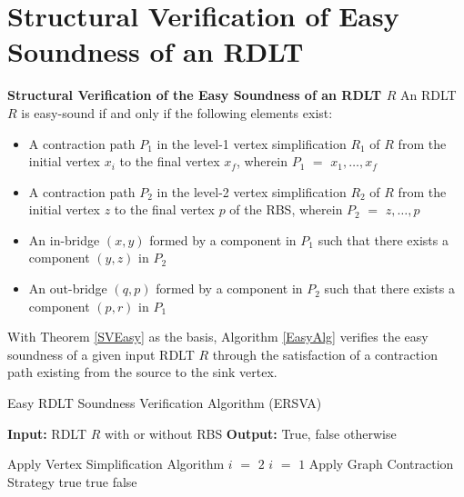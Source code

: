 \section*{Structural Verification of Easy Soundness of an RDLT}

\begin{thm}\textbf{Structural Verification of the Easy Soundness of an RDLT $ R $}
    \label{SVEasy}
    An RDLT $ R $ is easy-sound if and only if the following elements exist: 
    \begin{itemize}
        \item A contraction path $ P_1 $ in the level-1 vertex simplification $ R_1 $ of $ R $ from the initial vertex $ x_i $ to the final vertex $ x_f $, wherein $ P_1 $ $ = $ $ x_1, \ldots, x_f $
        \item A contraction path $ P_2 $ in the level-2 vertex simplification $ R_2 $ of $ R $ from the initial vertex $ z $ to the final vertex $ p $ of the RBS, wherein $ P_2 $ $ = $ $ z, \ldots, p $
        \item An in-bridge $ (x,y) $ formed by a component in $ P_1 $ such that there exists a component $ (y,z) $ in $ P_2 $
        \item An out-bridge $ (q,p) $ formed by a component in $ P_2 $ such that there exists a component $ (p,r) $ in $ P_1 $
    \end{itemize}
\end{thm}

With Theorem \ref{SVEasy} as the basis, Algorithm \ref{EasyAlg} verifies the easy soundness of a given input RDLT $ R $ through the satisfaction of a contraction path existing from the source to the sink vertex.

\begin{algorithm}[H]
    \caption{Easy RDLT Soundness Verification Algorithm (ERSVA) }
    \label{EasyAlg}
    \begin{algorithmic}
        \State \textbf{Input:} RDLT $ R $ with or without RBS
        \State \textbf{Output:} True, false otherwise
    \end{algorithmic}
    \begin{algorithmic}[1]
        \State Apply Vertex Simplification Algorithm \cite{Malinao2017}
            \State $ i $ $ = $ $ 2 $
        \Else
            \State $ i $ $ = $ $ 1 $
        \EndIf
            \State Apply Graph Contraction Strategy \cite{Malinao2017}
        \EndFor
                    \State \Return true
                \EndIf
            \EndIf
            \State \Return true
        \Else
            \State \Return false
        \EndIf
    \end{algorithmic}
\end{algorithm}

